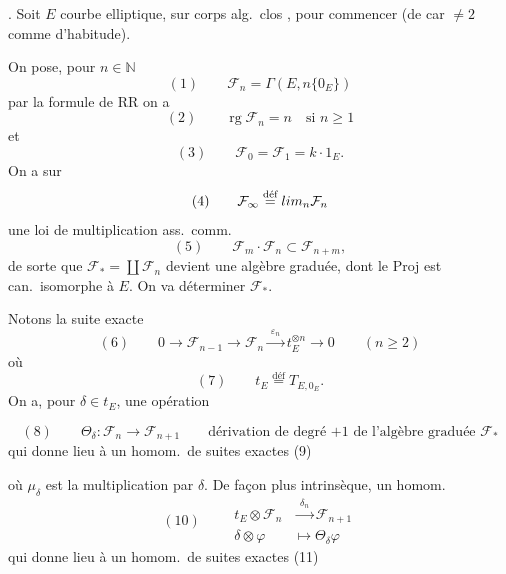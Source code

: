 \documentclass[11pt,a4paper]{article}
\begin{document}
. Soit $E$ courbe elliptique, sur corps  alg.\ clos
, pour commencer (de car $\neq 2$ comme d'habitude).

On pose, pour $n \in \mathbb{N}$
\[
  (1) \qquad \mathcal{F}_n = \Gamma(E, n\{0_E\})
\]
par la formule de RR on a
\[
  (2) \qquad \operatorname{rg} \mathcal{F}_n = n \quad\text{si } n \geqslant 1
\]
et
\[
  (3) \qquad \mathcal{F}_0 = \mathcal{F}_1 = k \cdot 1_E .
\]
On a  sur
\[
  (4) \qquad \mathcal{F}_\infty \overset{\text{déf}}{=} \varinjlim_n \mathcal{F}_n
\]
une loi de multiplication ass.\ comm.\ 
\[
  (5) \qquad \mathcal{F}_m \cdot \mathcal{F}_n \subset \mathcal{F}_{n+m} ,
\]
de sorte que $\mathcal{F}_* = \coprod \mathcal{F}_n$ devient une algèbre graduée,
dont le Proj est can.\ isomorphe à $E$. On va déterminer $\mathcal{F}_*$.

Notons la suite exacte
\[
  (6) \qquad 0 \to \mathcal{F}_{n-1} \to \mathcal{F}_n \xrightarrow{\;\varepsilon_n\;}
  t_E^{\otimes n} \to 0 \qquad (n \geqslant 2)
\]
où
\[
  (7) \qquad t_E \overset{\text{déf}}{=} T_{E, 0_E} .
\]
On a, pour $\delta \in t_E$, une opération

\[
  (8) \qquad \Theta_\delta : \mathcal{F}_n \longrightarrow \mathcal{F}_{n+1}
  \qquad \text{dérivation de degré $+1$ de l'algèbre graduée } \mathcal{F}_*
\]
qui donne lieu à un homom.\ de suites exactes
(9)



où $\mu_\delta$ est la multiplication par $\delta$. De façon plus intrinsèque,
 un homom.
\[
  (10) \qquad
  \begin{aligned}
    t_E \otimes \mathcal{F}_n &\xrightarrow{\;\delta_n\;} \mathcal{F}_{n+1} \\
    \delta \otimes \varphi &\longmapsto \Theta_\delta \varphi
  \end{aligned}
\]
qui donne lieu à un homom.\ de suites exactes
(11)
\end{document}
